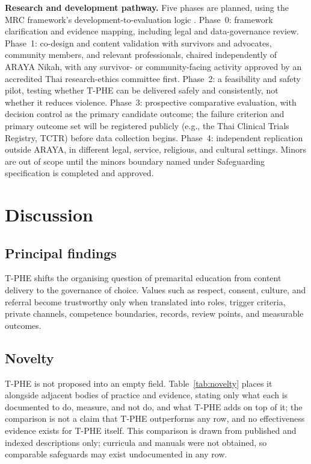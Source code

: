 \documentclass[11pt]{article}
\newcommand{\tphe}{T\mbox{-}PHE}
\begin{document}
\textbf{Research and development pathway.} Five phases are planned, using the MRC framework's development-to-evaluation logic \cite{ref52}. Phase~0: framework clarification and evidence mapping, including legal and data-governance review. Phase~1: co-design and content validation with survivors and advocates, community members, and relevant professionals, chaired independently of ARAYA Nikah, with any survivor- or community-facing activity approved by an accredited Thai research-ethics committee first. Phase~2: a feasibility and safety pilot, testing whether \tphe{} can be delivered safely and consistently, not whether it reduces violence. Phase~3: prospective comparative evaluation, with decision control as the primary candidate outcome; the failure criterion and primary outcome set will be registered publicly (e.g., the Thai Clinical Trials Registry, TCTR) before data collection begins. Phase~4: independent replication outside ARAYA, in different legal, service, religious, and cultural settings. Minors are out of scope until the minors boundary named under Safeguarding specification is completed and approved.

\section{Discussion}

\subsection{Principal findings}
\tphe{} shifts the organising question of premarital education from content delivery to the governance of choice. Values such as respect, consent, culture, and referral become trustworthy only when translated into roles, trigger criteria, private channels, competence boundaries, records, review points, and measurable outcomes.

\subsection{Novelty}
\tphe{} is not proposed into an empty field. Table~\ref{tab:novelty} places it alongside adjacent bodies of practice and evidence, stating only what each is documented to do, measure, and not do, and what \tphe{} adds on top of it; the comparison is not a claim that \tphe{} outperforms any row, and no effectiveness evidence exists for \tphe{} itself. This comparison is drawn from published and indexed descriptions only; curricula and manuals were not obtained, so comparable safeguards may exist undocumented in any row.
\end{document}
